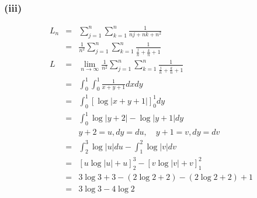\documentclass[11pt, titlepage]{jsarticle}
\begin{document}
\newpage
\subsubsection*{(iii)}
\begin{eqnarray*}
  L_n&=&\sum_{j=1}^n \sum_{k=1}^n \frac{1}{nj+nk+n^2} \\
  &=&\frac{1}{n^2} \sum_{j=1}^n \sum_{k=1}^n \frac{1}{\frac{j}{n}+\frac{k}{n}+1} \\
  L&=& \lim_{n\rightarrow\infty} \frac{1}{n^2} \sum_{j=1}^n \sum_{k=1}^n \frac{1}{\frac{j}{n}+\frac{k}{n}+1}\\
  &=&\int_0^1\int_0^1 \frac{1}{x+y+1}dxdy\\
  &=&\int_0^1\left[ \log\left| x+y+1 \right| \right]_0^1 dy\\
  &=&\int_0^1 \log \left| y+2 \right| - \log \left| y+1 \right| dy\\
  &&y+2=u, dy=du,\quad y+1=v, dy=dv \\
  &=&\int_2^3 \log\left| u \right|du - \int_1^2 \log\left| v \right|dv\\
  &=&\left[ u\log\left| u \right| + u\right]_2^3 - \left[v\log\left| v \right| + v\right]_1^2 \\
  &=&3\log3 + 3 - (2\log2 + 2) - (2\log2 + 2) + 1\\
  &=&3\log3-4\log2
\end{eqnarray*}
\end{document}
